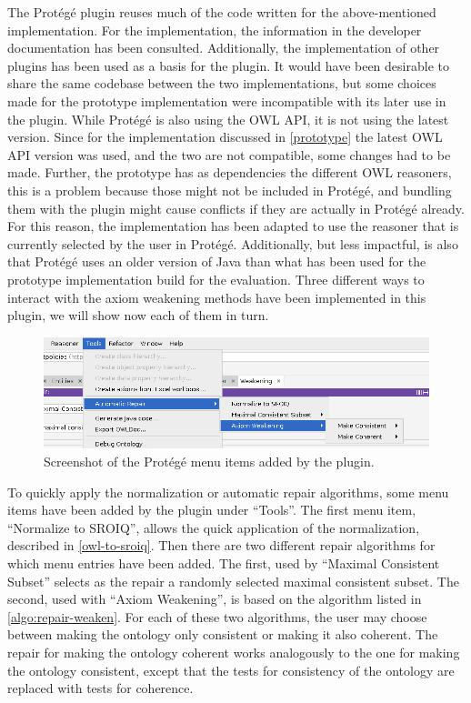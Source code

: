 
The Protégé plugin reuses much of the code written for the above-mentioned implementation. For the implementation, the information in the developer documentation \cite{protege5devdocs} has been consulted. Additionally, the implementation of other plugins \cite{ontodebug,protegepluginexamples} has been used as a basis for the plugin. It would have been desirable to share the same codebase between the two implementations, but some choices made for the prototype implementation were incompatible with its later use in the plugin. While Protégé is also using the OWL API, it is not using the latest version. Since for the implementation discussed in \cref{prototype} the latest OWL API version was used, and the two are not compatible, some changes had to be made. Further, the prototype has as dependencies the different OWL reasoners, this is a problem because those might not be included in Protégé, and bundling them with the plugin might cause conflicts if they are actually in Protégé already. For this reason, the implementation has been adapted to use the reasoner that is currently selected by the user in Protégé. Additionally, but less impactful, is also that Protégé uses an older version of Java than what has been used for the prototype implementation build for the evaluation. Three different ways to interact with the axiom weakening methods have been implemented in this plugin, we will show now each of them in turn.

\begin{figure}[ht]
  \centering
  \includegraphics[width=\textwidth]{resources/protege-menu.png}
  \caption{Screenshot of the Protégé menu items added by the plugin.}
  \label{fig:protege-menu}
\end{figure}

To quickly apply the normalization or automatic repair algorithms, some menu items have been added by the plugin under ``Tools''. The first menu item, ``Normalize to SROIQ'', allows the quick application of the normalization, described in \cref{owl-to-sroiq}. Then there are two different repair algorithms for which menu entries have been added. The first, used by ``Maximal Consistent Subset'' selects as the repair a randomly selected maximal consistent subset. The second, used with ``Axiom Weakening'', is based on the algorithm listed in \cref{algo:repair-weaken}. For each of these two algorithms, the user may choose between making the ontology only consistent or making it also coherent. The repair for making the ontology coherent works analogously to the one for making the ontology consistent, except that the tests for consistency of the ontology are replaced with tests for coherence.


